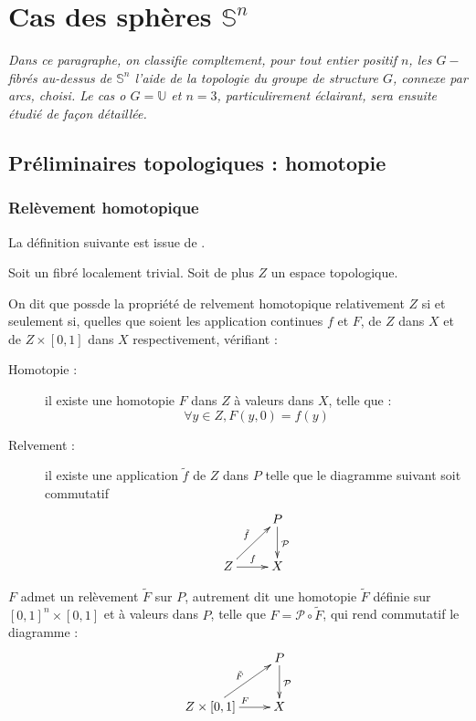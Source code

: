 \chapter{Cas des sph\`eres %
$\mathbb{S}^n$}

\emph{%
Dans ce paragraphe, on classifie compltement, pour tout entier positif $n$, les $G-$fibr\'es au-dessus de $\mathbb{S}^n$ %
 l'aide de la topologie du groupe de structure $G$, connexe par arcs, choisi. %
Le cas o $G=\mathbb{U}$ et $n=3$, particulirement \'eclairant, sera ensuite \'etudi\'e de fa\c con d\'etaill\'ee.%
}


\section{Pr\'eliminaires topologiques : homotopie}

\subsection{Rel\`evement homotopique}

La d\'efinition suivante est issue de \cite{NaberF}.

\begin{defi}
Soit \Fiy un fibr\'e localement trivial. Soit de plus $Z$ un espace topologique.

\par
On dit que \Fiy possde la propri\'et\'e de relvement homotopique relativement  $Z$ si et seulement si, %
quelles que soient les application continues $f$ et $F$, de $Z$ dans $X$ et de $Z\times [0,1]$ dans $X$ respectivement, v\'erifiant : 

{\em%
\begin{description}
\item[Homotopie :] il existe une homotopie $F$ dans $Z$ \`a valeurs dans $X$, telle que :
\[\forall y \in Z , F(y,0) = f(y)\]
%
\item[Relvement :] il existe une application $\tilde{f}$ de $Z$ dans $P$ telle que le diagramme suivant soit commutatif
\[\xymatrix{ &P \ar[d]^{\mathcal{P}} \\ Z \ar[r]^{f} \ar[ru]^{\tilde{f}} & X}\]
\end{description}
}

$F$ admet un rel\`evement $\tilde{F}$ sur $P$, autrement dit une homotopie $\tilde{F}$ d\'efinie sur $[0,1]^n \times [0,1]$ et \`a valeurs dans $P$, %
telle que $F = \mathcal{P} \circ \tilde{F}$, qui rend commutatif le diagramme :
\[\xymatrix{ &P \ar[d]^{\mathcal{P}} \\ Z \times [0,1] \ar[r]^{F} \ar[ru]^{\tilde{F}} & X}\]
\end{defi}

